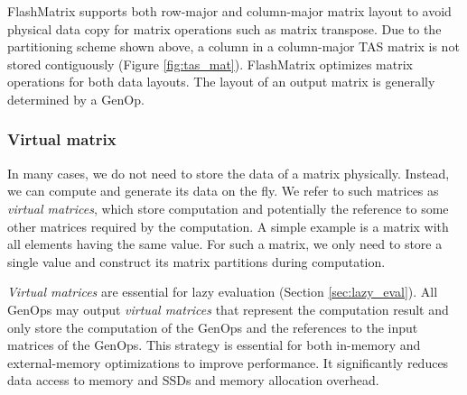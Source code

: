 
FlashMatrix supports both row-major and column-major matrix layout to avoid
physical data copy for matrix operations such as matrix transpose. Due to
the partitioning scheme shown above, a column in a column-major TAS matrix
is not stored contiguously (Figure \ref{fig:tas_mat}). FlashMatrix optimizes
matrix operations for both data layouts.
The layout of an output matrix is generally determined by a GenOp.

\subsubsection{Virtual matrix} \label{virt_mat}
In many cases, we do not need to store the data of a matrix physically. Instead,
we can compute and generate its data on the fly. We refer to such matrices as
\textit{virtual matrices}, which store computation and potentially the reference
to some other matrices required by the computation. A simple example is a matrix
with all elements having the same value. For such a matrix, we only need to store
a single value and construct its matrix partitions during computation.

\textit{Virtual matrices} are essential for lazy evaluation (Section
\ref{sec:lazy_eval}). All GenOps may output \textit{virtual matrices} that
represent the computation result and only store the computation of the GenOps
and the references to the input matrices of the GenOps. This strategy is
essential for both in-memory and external-memory optimizations to improve
performance. It significantly reduces data access to memory and SSDs and
memory allocation overhead.

